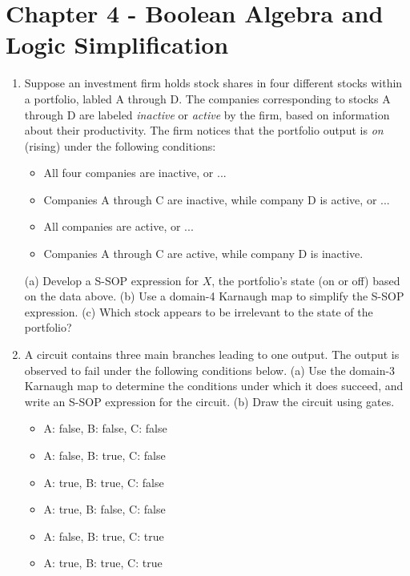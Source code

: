 \documentclass[10pt]{article}
\begin{document}
\clearpage

\section{Chapter 4 - Boolean Algebra and Logic Simplification}
\begin{enumerate}
\item Suppose an investment firm holds stock shares in four different stocks within a portfolio, labled A through D.  The companies corresponding to stocks A through D are labeled \textit{inactive} or \textit{active} by the firm, based on information about their productivity.  The firm notices that the portfolio output is \textit{on} (rising) under the following conditions:
\begin{itemize}
\item All four companies are inactive, or ...
\item Companies A through C are inactive, while company D is active, or ...
\item All companies are active, or ...
\item Companies A through C are active, while company D is inactive.
\end{itemize}
(a) Develop a S-SOP expression for $X$, the portfolio's state (on or off) based on the data above. (b) Use a domain-4 Karnaugh map to simplify the S-SOP expression. (c) Which stock appears to be irrelevant to the state of the portfolio? \\ \vspace{2.5cm}
\item A circuit contains three main branches leading to one output.  The output is observed to fail under the following conditions below.  (a) Use the domain-3 Karnaugh map to determine the conditions under which it does succeed, and write an S-SOP expression for the circuit. (b) Draw the circuit using gates.
\begin{itemize}
\item A: false, B: false, C: false
\item A: false, B: true, C: false
\item A: true, B: true, C: false
\item A: true, B: false, C: false
\item A: false, B: true, C: true
\item A: true, B: true, C: true
\end{itemize}
\end{enumerate}
\end{document}
